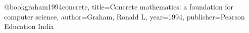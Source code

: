 @book{graham1994concrete,
  title={Concrete mathematics: a foundation for computer science},
  author={Graham, Ronald L},
  year={1994},
  publisher={Pearson Education India}
}
